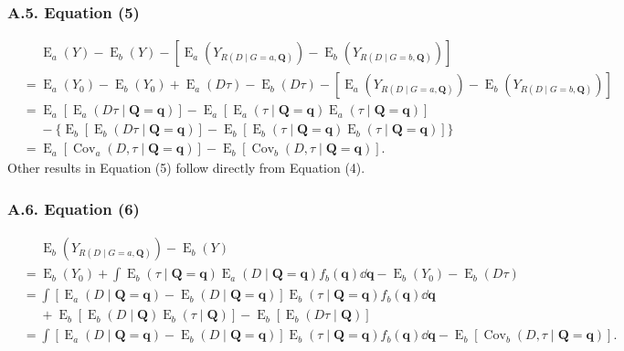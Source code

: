 \documentclass[12pt,a4paper]{article}
\newcommand{\Cov}{\operatorname{Cov}}
\newcommand{\E}{\operatorname{E}}
\def\Q{{\boldsymbol Q}}
\def\q{{\boldsymbol q}}
\begin{document}
\subsubsection*{A.5. Equation (5)}
\begin{align*}
    &\phantom{{}={}} \E_a(Y)-\E_b(Y)-[\E_a(Y_{R(D \mid G=a,\Q)})-\E_b(Y_{R(D \mid G=b,\Q)})] \\
    &= \E_a(Y_0)-\E_b(Y_0) + \E_a(D \tau) - \E_b(D \tau) -[\E_a(Y_{R(D \mid G=a,\Q)})-\E_b(Y_{R(D \mid G=b,\Q)})] \\
    &= \E_a[\E_a(D \tau \mid \Q=\q)] - \E_a[\E_a(\tau \mid \Q=\q)\E_a(\tau \mid \Q=\q)] \\
    &\phantom{{}={}} - \lbrace \E_b[\E_b(D \tau \mid \Q=\q)] - \E_b[\E_b(\tau \mid \Q=\q)\E_b(\tau \mid \Q=\q)] \rbrace \\
    &= \E_a[\Cov_a(D, \tau \mid \Q=\q)]- \E_b[\Cov_b(D, \tau \mid \Q=\q)].
\end{align*}
Other results in Equation (5) follow directly from Equation (4).

\subsubsection*{A.6. Equation (6)}
\begin{align*}
    &\phantom{{}={}} \E_b(Y_{R(D \mid G=a, \boldsymbol{Q})})-\E_b(Y) \\
    &= \E_b(Y_0) + \int \E_b(\tau \mid \Q=\q) \E_a(D \mid \Q=\q) f_b(\q) \dd \q - \E_b(Y_0) - \E_b(D \tau) \\
    &= \int [\E_a(D \mid \Q=\q) - \E_b(D \mid \Q=\q) ] \E_b(\tau \mid \Q=\q) f_b(\q) \dd \q \\
    &\phantom{{}={}} + \E_b [\E_b(D \mid \Q)\E_b(\tau \mid \Q) ] - \E_b[\E_b(D \tau \mid \Q)] \\
    &= \int [\E_a(D \mid \Q=\q) - \E_b(D \mid \Q=\q) ] \E_b(\tau \mid \Q=\q) f_b(\q) \dd \q - \E_b[\Cov_b(D, \tau \mid \Q=\q)].
\end{align*}
\end{document}
